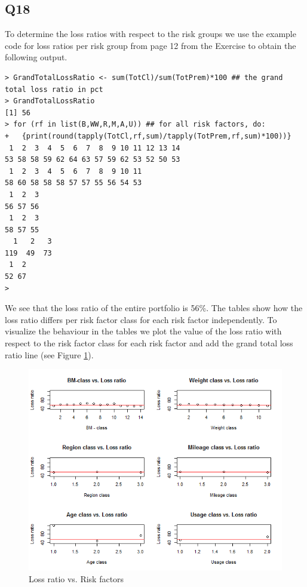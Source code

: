 \documentclass[11pt]{article}
\begin{document}
\subsection*{Q18}
To determine the loss ratios with respect to the risk groups we use the example code for loss ratios per risk group from page 12 from the Exercise to obtain the following output.
\begin{verbatim}
> GrandTotalLossRatio <- sum(TotCl)/sum(TotPrem)*100 ## the grand total loss ratio in pct
> GrandTotalLossRatio
[1] 56
> for (rf in list(B,WW,R,M,A,U)) ## for all risk factors, do:
+   {print(round(tapply(TotCl,rf,sum)/tapply(TotPrem,rf,sum)*100))}
 1  2  3  4  5  6  7  8  9 10 11 12 13 14 
53 58 58 59 62 64 63 57 59 62 53 52 50 53 
 1  2  3  4  5  6  7  8  9 10 11 
58 60 58 58 58 57 57 55 56 54 53 
 1  2  3 
56 57 56 
 1  2  3 
58 57 55 
  1   2   3 
119  49  73 
 1  2 
52 67 
> 
\end{verbatim}
We see that the loss ratio of the entire portfolio is 56\%. The tables show how the loss ratio differs per risk factor class for each risk factor independently. To visualize the behaviour in the tables we plot the value of the loss ratio with respect to the risk factor class for each risk factor and add the grand total loss ratio line (see Figure \ref{Figure_Question18}).
\begin{center}
\begin{figure}[h]

\includegraphics[scale=1]{Q18_Risk_factors_vs_loss_ratio.png}

\caption{Loss ratio vs. Risk factors}
\label{Figure_Question18}

\end{figure}
\end{center}
\end{document}
